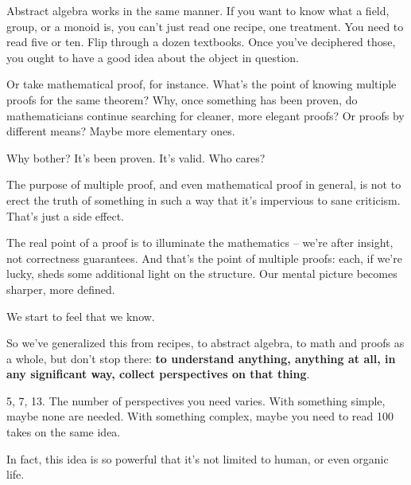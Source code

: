 Abstract algebra works in the same manner. If you want to know what a field,
group, or a monoid is, you can't just read one recipe, one treatment. You need
to read five or ten. Flip through a dozen textbooks. Once you've deciphered those, you ought to have a good
idea about the object in question.

Or take mathematical proof, for instance. What's the point of knowing multiple
proofs for the same theorem? Why, once something has been proven, do
mathematicians continue searching for cleaner, more elegant proofs? Or proofs by
different means? Maybe more elementary ones.

Why bother? It's been proven. It's valid. Who cares?

The purpose of multiple proof, and even mathematical proof in general, is not to
erect the truth of something in such a way that it's impervious to sane
criticism. That's just a side effect.

The real point of a proof is to illuminate the mathematics -- we're after
insight, not correctness guarantees. And that's the point of multiple proofs:
each, if we're lucky, sheds some additional light on the structure. Our mental
picture becomes sharper, more defined.

We start to feel that we know.

So we've generalized this from recipes, to abstract algebra, to math and proofs
as a whole, but don't stop there: \textbf{to understand anything, anything at all, in
  any significant way, collect perspectives on that thing}.

5, 7, 13. The number of perspectives you need varies. With something simple,
maybe none are needed. With something complex, maybe you need to read 100 takes
on the same idea.

In fact, this idea is so powerful that it's not limited to human, or even
organic life. 
